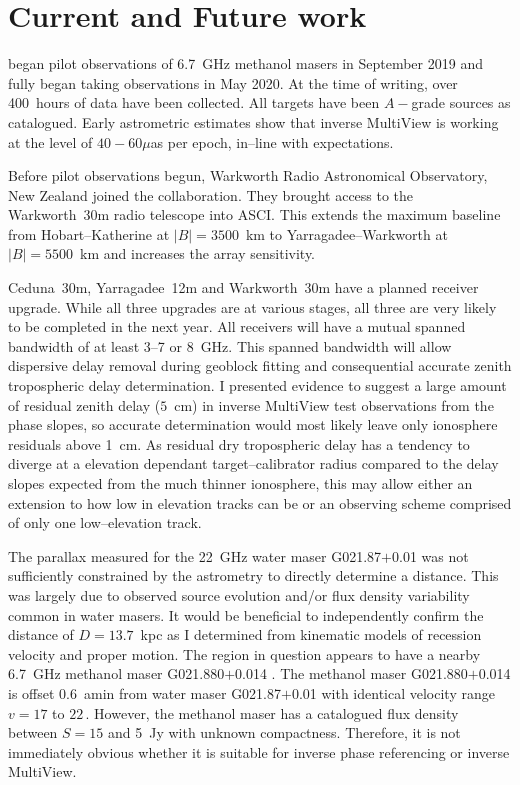 \section{Current and Future work}
	\spirals\space began pilot observations of 6.7~GHz methanol masers in September 2019 and fully began taking observations in May 2020. At the time of writing, over 400~hours of data have been collected. All \spirals\space targets have been $A-$grade sources as catalogued. Early astrometric estimates show that inverse MultiView is working at the level of $40-60\mu$as per epoch, in--line with expectations.
	
	Before pilot observations begun, Warkworth Radio Astronomical Observatory, New Zealand joined the \spirals\space collaboration. They brought access to the Warkworth~30m radio telescope into ASCI. This extends the maximum baseline from Hobart--Katherine at $|B|=3500$~km to Yarragadee--Warkworth at $|B|=5500$~km and increases the array sensitivity. 
	
	Ceduna~30m, Yarragadee~12m and Warkworth~30m have a planned receiver upgrade. While all three upgrades are at various stages, all three are very likely to be completed in the next year. All receivers will have a mutual spanned bandwidth of at least 3--7 or 8~GHz. This spanned bandwidth will allow dispersive delay removal during geoblock fitting and consequential accurate zenith tropospheric delay determination. I presented evidence to suggest a large amount of residual zenith delay ($5$~cm) in inverse MultiView test observations from the phase slopes, so accurate determination would most likely leave only ionosphere residuals above 1~cm. As residual dry tropospheric delay has a tendency to diverge at a elevation dependant target--calibrator radius compared to the delay slopes expected from the much thinner ionosphere, this may allow either an extension to how low in elevation tracks can be or an observing scheme comprised of only one low--elevation track.
	

	The parallax measured for the 22~GHz water maser G021.87$+$0.01 was not sufficiently constrained by the astrometry to directly determine a distance. This was largely due to observed source evolution and/or flux density variability common in water masers. It would be beneficial to independently confirm the distance of $D=13.7$~kpc as I determined from kinematic models of recession velocity and proper motion. The region in question appears to have a nearby 6.7~GHz methanol maser G021.880$+$0.014 \citep{Caswell1995a,Breen2015}. The methanol maser G021.880$+$0.014 is offset 0.6~amin from water maser G021.87$+$0.01 with identical velocity range $v=17$ to $22$\,\kms. However, the methanol maser has a catalogued flux density between $S=15$ and 5~Jy with unknown compactness. Therefore, it is not immediately obvious whether it is suitable for inverse phase referencing or inverse MultiView. 
	
